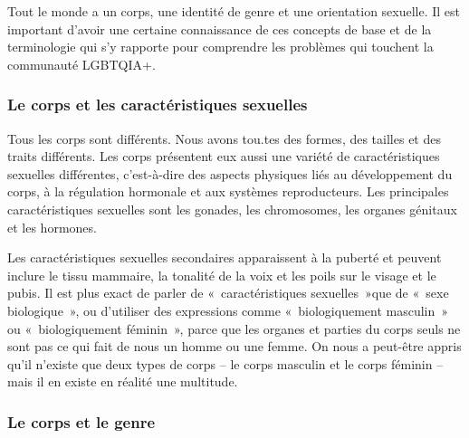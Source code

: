 \documentclass[12pt,openany]{book}
\begin{document}
\noindent Tout le monde a un corps, une identité de genre et une orientation sexuelle. Il est important d’avoir une certaine connaissance de ces concepts de base et de la terminologie qui s’y rapporte pour comprendre les problèmes qui touchent la communauté \mbox{LGBTQIA+}.

\subsubsection*{Le corps et les caractéristiques sexuelles}

\noindent Tous les corps sont différents. Nous avons tou.tes des formes, des tailles et des traits différents. Les corps présentent eux aussi une variété de caractéristiques sexuelles différentes, c’est-à-dire des aspects physiques liés au développement du corps, à la régulation hormonale et aux systèmes reproducteurs. Les principales caractéristiques sexuelles sont les gonades, les chromosomes, les organes génitaux et les hormones.

Les caractéristiques sexuelles secondaires apparaissent à la puberté et peuvent inclure le tissu mammaire, la tonalité de la voix et les poils sur le visage et le pubis. Il est plus exact de parler de \mbox{« c}aractéristiques sexuelle\mbox{s »}que de \mbox{« s}exe biologiqu\mbox{e »}, ou d’utiliser des expressions comme \mbox{« b}iologiquement masculi\mbox{n »} ou \mbox{« b}iologiquement fémini\mbox{n »}, parce que les organes et parties du corps seuls ne sont pas ce qui fait de nous un homme ou une femme. On nous a peut-être appris qu’il n’existe que deux types de corps – le corps masculin et le corps féminin – mais il en existe en réalité une multitude.

\begin{figure}[h]
    \centering
\end{figure}

\subsubsection*{Le corps et le genre}
\end{document}
